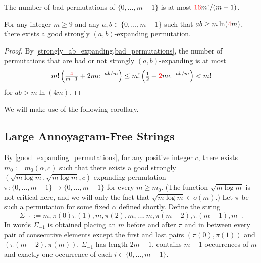 \documentclass[kpfonts]{patmorin}
\newcommand{\coloured}[2]{{\color{#1}{#2}}}
\newcommand{\colored}[2]{{\color{#1}#2}}
\begin{document}
\begin{lem}\label{bad_permutations}
    The number of bad permutations of $\{0,\ldots,m-1\}$ is at most $\coloured{red}{16}m!/(m-1)$.
\end{lem}
%
%
\begin{lem}\label{good_expanding_permutations}
    For any integer $m\ge 9$ and any $a,b\in\{0,\ldots,m-1\}$ such that $ab\ge m\ln(\colored{red}{4}m)$, there exists a good strongly $(a,b)$-expanding permutation.
\end{lem}

\begin{proof}
    By \cref{strongly_ab_expanding,bad_permutations}, the number of permutations that are bad or not strongly $(a,b)$-expanding is at most
    \[  m!\left(\tfrac{\coloured{red}{4}}{m-1} + 2me^{-ab/m}\right) \le m!\left(\tfrac{1}{2}+\coloured{red}{2}me^{-ab/m}\right) < m! \]
    for $ab > m\ln(4m)$.
\end{proof}

We will make use of the following corollary.


\subsection{Large Annoyagram-Free Strings}

By \cref{good_expanding_permutations}, for any positive integer $c$, there exists $m_0:=m_0(\alpha,c)$ such that there exists a good strongly $(\sqrt{m\log m}, \sqrt{m\log m}, c)$-expanding permutation $\pi:\{0,\ldots,m-1\}\to\{0,\ldots,m-1\}$ for every $m\ge m_0$.  (The function $\sqrt{m\log m}$ is not critical here, and we will only the fact that $\sqrt{m\log m}\in o(m)$.) Let $\pi$ be such a permutation for some fixed $\alpha$ defined shortly.  Define the string
\[
    \Sigma_{-1} := m,\pi(0)\pi(1),m,\pi(2),m,\ldots,m,\pi(m-2),\pi(m-1),m \enspace .
\]
In words $\Sigma_{-1}$ is obtained placing an $m$ before and after $\pi$ and in between every pair of consecutive elements except the first and last pairs $(\pi(0),\pi(1))$ and $(\pi(m-2),\pi(m))$.  $\Sigma_{-1}$ has length $2m-1$, contains $m-1$ occurrences of $m$ and exactly one occurrence of each $i\in\{0,\ldots,m-1\}$.
\end{document}
